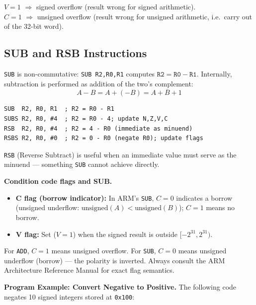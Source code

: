 \documentclass[11pt, a4paper, notitlepage]{report}
\theoremstyle{definition}
\theoremstyle{remark}
\theoremstyle{definition}
\begin{document}
\begin{keyresult}[title={V flag vs.\ C flag for ADD}]
$V = 1$ $\Rightarrow$ signed overflow (result wrong for signed arithmetic).\\
$C = 1$ $\Rightarrow$ unsigned overflow (result wrong for unsigned arithmetic, i.e.\ carry out of the 32-bit word).
\end{keyresult}

\subsection{SUB and RSB Instructions}

\texttt{SUB} is non-commutative: \texttt{SUB R2,R0,R1} computes $\texttt{R2} = \texttt{R0} - \texttt{R1}$. Internally, subtraction is performed as addition of the two's complement:
\[
  A - B = A + (-B) = A + \overline{B} + 1
\]

\begin{lstlisting}
SUB  R2, R0, R1  ; R2 = R0 - R1
SUBS R2, R0, #4  ; R2 = R0 - 4; update N,Z,V,C
RSB  R2, R0, #4  ; R2 = 4 - R0 (immediate as minuend)
RSBS R2, R0, #0  ; R2 = 0 - R0 (negate R0); update flags
\end{lstlisting}

\texttt{RSB} (Reverse Subtract) is useful when an immediate value must serve as the minuend --- something \texttt{SUB} cannot achieve directly.

\textbf{Condition code flags and SUB.}

\begin{itemize}
  \item \textbf{C flag (borrow indicator):} In ARM's \texttt{SUB}, $C = 0$ indicates a borrow (unsigned underflow: $\text{unsigned}(A) < \text{unsigned}(B)$); $C = 1$ means no borrow.
  \item \textbf{V flag:} Set ($V = 1$) when the signed result is outside $[-2^{31}, 2^{31})$.
\end{itemize}

\begin{warning}[title={C flag polarity differs for SUB vs.\ ADD}]
For \texttt{ADD}, $C = 1$ means unsigned overflow. For \texttt{SUB}, $C = 0$ means unsigned underflow (borrow) --- the polarity is inverted. Always consult the ARM Architecture Reference Manual for exact flag semantics.
\end{warning}

\textbf{Program Example: Convert Negative to Positive.} The following code negates 10 signed integers stored at \texttt{0x100}:
\end{document}
